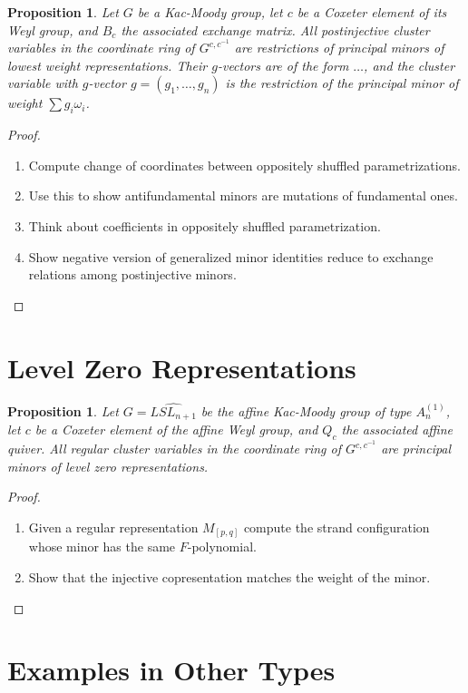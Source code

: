 \documentclass[11pt]{amsart}
\newtheorem{proposition}[theorem]{Proposition}
\numberwithin{equation}{section}
\begin{document}
\begin{proposition}
Let $G$ be a Kac-Moody group, let $c$ be a Coxeter element of its Weyl group, and $B_c$ the associated exchange matrix.  All postinjective cluster variables in the coordinate ring of $G^{c,c^{-1}}$ are restrictions of principal minors of lowest weight representations.  Their $g$-vectors are of the form $\dotsc$, and the cluster variable with $g$-vector $g = (g_1,\dotsc,g_n)$ is the restriction of the principal minor of weight $\sum g_i \omega_i$.
\end{proposition}
\begin{proof}
\begin{enumerate}
\item Compute change of coordinates between oppositely shuffled parametrizations.
\item Use this to show antifundamental minors are mutations of fundamental ones.
\item Think about coefficients in oppositely shuffled parametrization.
\item Show negative version of generalized minor identities reduce to exchange relations among postinjective minors.
\end{enumerate}
\end{proof}

\section{Level Zero Representations}

\begin{proposition}
Let $G = \widehat{LSL_{n+1}}$ be the affine Kac-Moody group of type $A_n^{(1)}$, let $c$ be a Coxeter element of the affine Weyl group, and $Q_c$ the associated affine quiver.  All regular cluster variables in the coordinate ring of $G^{c,c^{-1}}$ are principal minors of level zero representations.  
\end{proposition}
\begin{proof}
\begin{enumerate}
\item Given a regular representation $M_{[p,q]}$ compute the strand configuration whose minor has the same $F$-polynomial.
\item Show that the injective copresentation matches the weight of the minor.
\end{enumerate}
\end{proof}

\section{Examples in Other Types}
\end{document}

